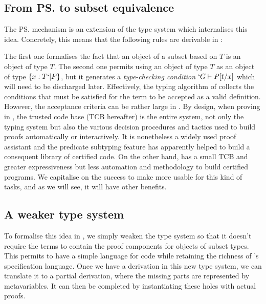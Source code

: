 \documentclass{llncs}
\begin{document}
\subsection{From \ps{} to subset equivalence}
The \ps{} mechanism \cite{Shankar&Owre:WADT99} %
is an extension of the \PVS type system which internalises this idea.
Concretely, this means that the following rules are derivable in \PVS:
\begin{center}
  \DP
  \DP
\end{center}

The first one formalises the fact that an object of a subset based on
$T$ is an object of type $T$. The second one permits using an object of
type $T$ as an object of type $\{ x : T `| P \}$, but it generates a
\emph{type-checking condition} $`G \vdash P[t/x]$ which will need to be
discharged later. Effectively, the typing algorithm of \PVS{} collects
the conditions that must be satisfied for the term to be accepted as a
valid definition. However, the acceptance criteria can be rather large in
\PVS{}. By design, when proving in \PVS{}, the trusted code base (TCB
hereafter) is the entire system, not only the typing system but also the
various decision procedures and tactics used to build proofs
automatically or interactively. It is nonetheless a widely used proof
assistant and the predicate subtyping feature has apparently helped to
build a consequent library of certified code. On the other hand, \Coq
has a small TCB and greater expressiveness but less automation and
methodology to build certified programs. We capitalise on the \PVS
success to make \Coq more usable for this kind of tasks, and as we will see,
it will have other benefits.

\subsection{A weaker type system}
To formalise this idea in \Coq, we simply weaken the type system so that
it doesn't require the terms to contain the proof components for objects
of subset types. This permits to have a simple language for code while
retaining the richness of \Coq's specification language. Once we have a
derivation in this new type system, we can translate it to a partial
\Coq derivation, where the missing parts are represented by
metavariables. It can then be completed by instantiating these holes
with actual proofs.
\end{document}
